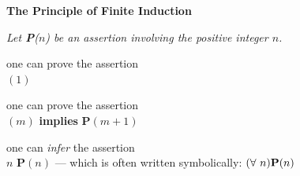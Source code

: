 \noindent %
\hspace*{.1in}\begin{minipage}{0.95\textwidth}
{\bf The Principle of Finite Induction}

{\em
Let {\bf P}($n$) be an assertion involving the positive integer $n$.

\hspace*{.15in}{\bf if} one can prove the assertion \\
\hspace*{.35in}{\bf P}$(1)$

\hspace*{.15in}{\bf and} one can prove the assertion \\
\hspace*{.35in}{\bf P}$(m)$ {\bf implies} {\bf P}$(m+1)$

\hspace*{.15in}{\bf then} one can {\em infer} the assertion \\
\hspace*{.35in}{\bf for all} $n$ {\bf P}$(n)$
   \hspace*{.15in}--- which is often written symbolically:  $(\forall \ n) \mbox{\bf P}(n)$
}
\end{minipage} %

\bigskip

 

